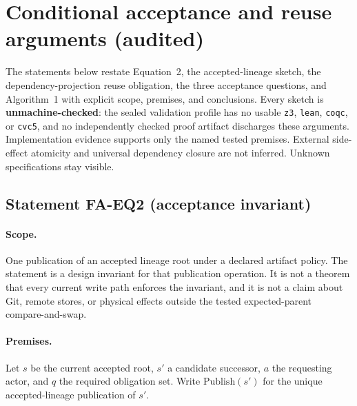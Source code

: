 %

\section*{Conditional acceptance and reuse arguments (audited)}
\label{sec:formal-arguments-ns023}

The statements below restate Equation~2, the accepted-lineage sketch, the
dependency-projection reuse obligation, the three acceptance questions, and
Algorithm~1 with explicit scope, premises, and conclusions. Every sketch is
\textbf{unmachine-checked}: the sealed validation profile has no usable
\texttt{z3}, \texttt{lean}, \texttt{coqc}, or \texttt{cvc5}, and no independently
checked proof artifact discharges these arguments. Implementation evidence
supports only the named tested premises. External side-effect atomicity and
universal dependency closure are not inferred. Unknown specifications stay
visible.

\subsection*{Statement FA-EQ2 (acceptance invariant)}
\label{stmt:fa-eq2}

\paragraph{Scope.}
One publication of an accepted lineage root under a declared artifact policy.
The statement is a design invariant for that publication operation. It is not a
theorem that every current write path enforces the invariant, and it is not a
claim about Git, remote stores, or physical effects outside the tested
expected-parent compare-and-swap.

\paragraph{Premises.}
Let $s$ be the current accepted root, $s'$ a candidate successor, $a$ the
requesting actor, and $q$ the required obligation set. Write $\mathrm{Publish}(s')$
for the unique accepted-lineage publication of $s'$.

